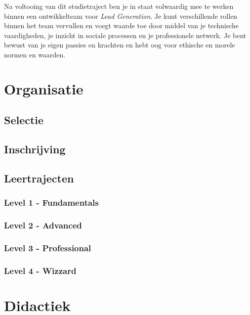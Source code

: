 \documentclass[]{book}
\begin{document}
Na voltooing van dit studietraject ben je in staat volwaardig mee te
werken binnen een ontwikkelteam voor \emph{Lead Generation}. Je kunt
verschillende rollen binnen het team vervullen en voegt waarde toe door
middel van je technische vaardigheden, je inzicht in sociale processen
en je professionele netwerk. Je bent bewust van je eigen passies en
krachten en hebt oog voor ethische en morele normen en waarden.

\section{Organisatie}\label{organisatie}

\subsection{Selectie}\label{selectie}

\subsection{Inschrijving}\label{inschrijving}

\subsection{Leertrajecten}\label{leertrajecten}

\subsubsection{Level 1 - Fundamentals}\label{level-1---fundamentals}

\subsubsection{Level 2 - Advanced}\label{level-2---advanced}

\subsubsection{Level 3 - Professional}\label{level-3---professional}

\subsubsection{Level 4 - Wizzard}\label{level-4---wizzard}

\section{Didactiek}\label{didactiek}
\end{document}
